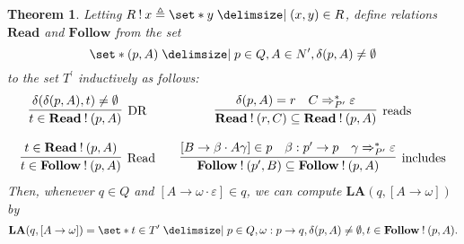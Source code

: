 \documentclass[12pt]{article}
\newtheorem{theorem}{Theorem}
\begin{document}
\begin{theorem}
Letting $ R \mathbin{!} x \triangleq \set*{ y \mid ( x , y ) \in R } $, define relations $\mathbf{Read}$ and $\mathbf{Follow}$ from the set \[ \set*{ ( p , A ) \mid p \in Q , A \in N^\prime , \delta ( p , A ) \ne \emptyset } \] to the set $T^\prime$ inductively as follows:
\[
\begin{matrix}
\infer[\mathrm{DR}]{ t \in \mathbf{Read} \mathbin{!} ( p , A ) }{ \delta ( \delta ( p , A ) , t ) \ne \emptyset } & & \infer[\mathrm{reads}]{ \mathbf{Read} \mathbin{!} ( r , C ) \subseteq \mathbf{Read} \mathbin{!} ( p , A ) }{ \delta ( p , A ) = r & C \Rightarrow_{P^\prime}^\ast \varepsilon } \\
& & \\
\infer[\mathrm{Read}]{ t \in \mathbf{Follow} \mathbin{!} ( p , A ) }{ t \in \mathbf{Read} \mathbin{!} ( p , A ) } & & \infer[\mathrm{includes}]{ \mathbf{Follow} \mathbin{!} ( p^\prime , B ) \subseteq \mathbf{Follow} \mathbin{!} ( p , A ) }{ [ B \to \beta \cdot A \gamma ] \in p & \beta : p^\prime \to p & \gamma \Rightarrow_{P^\prime}^\ast \varepsilon }
\end{matrix}
\]
Then, whenever $q \in Q$ and $[ A \to \omega \cdot \varepsilon ] \in q$, we can compute $\mathbf{LA} (q , [ A \to \omega ])$ by
\begin{align}
\mathbf{LA} ( q , [ A \to \omega ] ) = \set*{ t \in T^\prime \mid p \in Q , \omega : p \to q , \delta ( p , A ) \ne \emptyset , t \in \mathbf{Follow} \mathbin{!} ( p , A ) } .
\end{align}
\end{theorem}
\end{document}
